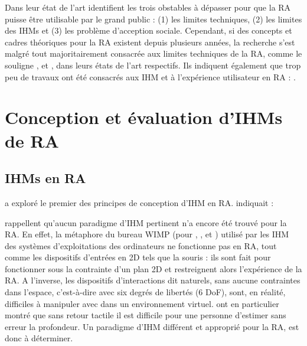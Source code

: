 



Dans leur état de l'art \cite{Azuma2001} identifient les trois obstables à dépasser pour que la RA puisse être utilisable par le grand public : (1) les limites techniques, (2) les limites des IHMs et (3) les problème d'acception sociale. Cependant, si des concepts et cadres théoriques pour la RA existent depuis plusieurs années, la recherche s'est malgré tout majoritairement consacrée aux limites techniques de la RA, comme le souligne \cite{Zhou2008}, \cite{VanKrevelen2010} et \cite{Billinghurst2015}, dans leurs états de l'art respectifs. Ils indiquent également que trop peu de travaux ont été consacrés aux IHM et à l'expérience utilisateur en RA :  \citep{Billinghurst2015}.


\section{Conception et évaluation d'IHMs de RA}
\subsection{IHMs en RA}
\cite{Billinghurst2005} a exploré le premier des principes de conception d'IHM en RA. indiquait : 

\cite{VanKrevelen2010} rappellent qu'aucun paradigme d'IHM pertinent n'a encore été trouvé pour la RA. En effet, la métaphore du bureau WIMP (pour , ,  et ) utilisé par les IHM des systèmes d'exploitations des ordinateurs ne fonctionne pas en RA, tout comme les dispositifs d'entrées en 2D tels que la souris : ils sont fait pour fonctionner sous la contrainte d'un plan 2D et restreignent alors l'expérience de la RA. \citep{VanKrevelen2010} A l'inverse, les dispositifs d'interactions dit naturels, sans aucune contraintes dans l'espace, c'est-à-dire avec six degrés de libertés (6 DoF), sont, en réalité, difficiles à manipuler avec dans un environnement virtuel. \cite{ChanKaoChenEtAl2010} ont en particulier montré que sans retour tactile il est difficile pour une personne d'estimer sans erreur la profondeur. Un paradigme d'IHM différent et approprié pour la RA, est donc à déterminer.


